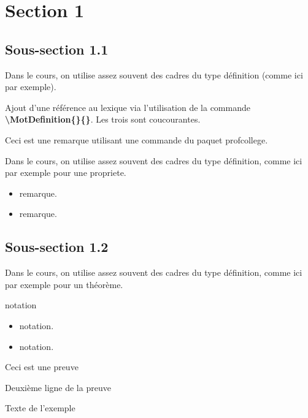 \section{Section 1}
\subsection{Sous-section 1.1}
\begin{definition}
    Dans le cours, on utilise assez souvent des cadres du type
    définition (comme ici par exemple).

    Ajout d'une référence au lexique via l'utilisation de la commande \textbf{\textbackslash MotDefinition\{\}\{\}}.
    Les trois   sont coucourantes.
    
\end{definition}
\begin{remarque}
    Ceci est une remarque utilisant une commande du paquet profcollege.

    \begin{center}
    \end{center}


\end{remarque}
\begin{propriete}
  Dans le cours, on utilise assez souvent des cadres du type
  définition, comme ici par exemple pour une propriete.
\end{propriete}
\begin{remarques}
  \begin{itemize}
    \item remarque.
    \item remarque.
  \end{itemize}
\end{remarques}

\subsection{Sous-section 1.2}
\begin{theoreme}
  Dans le cours, on utilise assez souvent des cadres du type
  définition, comme ici par exemple pour un théorème.
\end{theoreme}
\begin{notation}
  notation
\end{notation}
\begin{notations}
  \begin{itemize}
    \item notation.
    \item notation.
  \end{itemize}
\end{notations}
\begin{preuve}
  Ceci est une preuve\par Deuxième ligne de la preuve
\end{preuve}
\begin{exemple}
  Texte de l’exemple
  \correction
  
\end{exemple}

